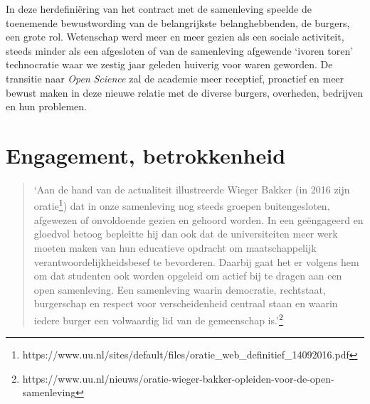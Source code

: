 \documentclass[smallauthor, chapterhaspagenum, nochapterinheader, pagenuminheader,  bigchapnum,medium2, tocpages,  garamond, titleinheader]{jote-book}
\begin{document}
	In deze herdefiniëring van het contract met de samenleving speelde de toenemende bewustwording van de belangrijkste belanghebbenden, de burgers, een grote rol. Wetenschap werd meer en meer gezien als een sociale activiteit, steeds minder als een afgesloten of van de samenleving afgewende ‘ivoren toren' technocratie waar we zestig jaar geleden huiverig voor waren geworden. De transitie naar \emph{Open }\emph{Science} zal de academie meer receptief, proactief en meer bewust maken in deze nieuwe relatie met de diverse burgers, overheden, bedrijven en hun problemen.



	\section{Engagement, betrokkenheid}

	\begin{quote}
		\itshape

		‘Aan de hand van de actualiteit illustreerde Wieger Bakker (in 2016 zijn oratie\footnote{https://www.uu.nl/sites/default/files/oratie\_web\_definitief\_14092016.pdf}) dat in onze samenleving nog steeds groepen buitengesloten, afgewezen of onvoldoende gezien en gehoord worden. In een geëngageerd en gloedvol betoog bepleitte hij dan ook dat de universiteiten meer werk moeten maken van hun educatieve opdracht om maatschappelijk verantwoordelijkheidsbesef te bevorderen. Daarbij gaat het er volgens hem om dat studenten ook worden opgeleid om actief bij te dragen aan een open samenleving. Een samenleving waarin democratie, rechtstaat, burgerschap en respect voor verscheidenheid centraal staan en waarin iedere burger een volwaardig lid van de gemeenschap is.'\footnote{https://www.uu.nl/nieuws/oratie-wieger-bakker-opleiden-voor-de-open-samenleving}
	\end{quote}
\end{document}

